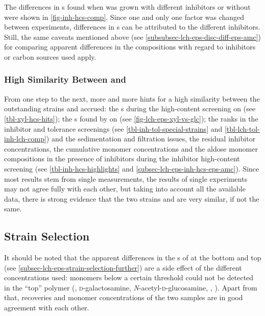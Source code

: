 The differences in \eps{} \amc{}s found when  was grown with different inhibitors or without were shown in \vref{fig-inh-hcs-comp}. Since one and only one factor was changed between experiments, differences in \eps{} \amc{}s can be attributed to the different inhibitors. Still, the same caveats mentioned above (see \vref{subsubsec-lch-eps-disc-diff-eps-amc}) for comparing apparent differences in the compositions with regard to inhibitors or carbon sources used apply.

\subsubsection{High Similarity Between  and }
From one step to the next, more and more hints for a high similarity between the outstanding strains  and  accrued: the \eps{} \amc{}s during the high-content screening on \xyl{} (see \vref{tbl-xyl-hcs-hits}); the \eps{} \amc{}s found by \textcite{Ruehmann2015b} on \glc{} (see \vref{fig-lch-eps-xyl-vs-glc}); the ranks in the inhibitor and \lch{} tolerance screenings (see \vref{tbl-inh-tol-special-strains} and \vref{tbl-lch-tol-inh-lch-comp}) and the sedimentation and filtration issues, the residual inhibitor concentrations, the cumulative monomer concentrations and the \eps{} aldose monomer compositions in the presence of inhibitors during the inhibitor high-content screening (see \vref{tbl-inh-hcs-highlights} and \vref{subsec-lch-eps-inh-hcs-eps-amc}). Since most results stem from single measurements, the results of single experiments may not agree fully with each other, but taking into account all the available data, there is strong evidence that the two strains  and  are very similar, if not the same.

\subsection{Strain Selection\label{subsec-lch-eps-disc-strain}}
It should be noted that the apparent differences in the \eps{}s of  at the bottom and top (see \vref{subsec-lch-eps-strain-selection-further}) are a side effect of the different concentrations used: monomers below a certain threshold could not be detected in the \enquote{top} polymer (\gal{}, \textsc{d}-galactosamine, \textit{N}-acetyl-\textsc{d}-glucosamine, \glcua{}, \rha{}). Apart from that, recoveries and monomer concentrations of the two  samples are in good agreement with each other.

